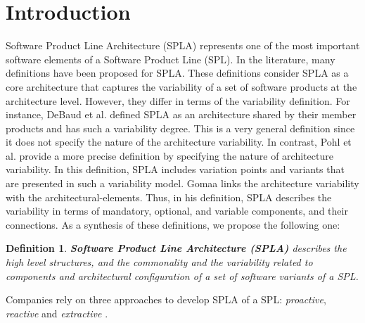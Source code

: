 \documentclass[graybox]{svmult}
\newtheorem{mydef}{Definition}
\begin{document}
\section{Introduction}
\label{sec:1:intro}
Software Product Line Architecture (SPLA) represents one of the most important software elements of a Software Product Line (SPL). In the literature, many definitions have been proposed for SPLA. These definitions consider SPLA as a core architecture that captures the variability of a set of software products at the architecture level. However, they differ in terms of the variability definition. For instance, DeBaud et al. \cite{debaud1998pulse} defined  SPLA as an architecture shared by their member products and has such a variability degree. This is a very general definition since it does not specify the nature of the architecture variability. In contrast, Pohl et al. \cite{3_pohl2005software} provide a more precise definition by specifying the nature of architecture variability. In this definition, SPLA includes variation points and variants that are presented in such a variability model. Gomaa \cite{Gomaa} links the architecture variability with the architectural-elements. Thus, in his definition, SPLA describes the variability in terms of mandatory, optional, and variable components, and their connections. As a synthesis of these definitions, we propose the following one:

\begin{mydef}
\textbf{Software Product Line Architecture (SPLA)} describes the high level structures, and the commonality and the variability related to components and architectural configuration of a set of software variants of a SPL. 
\end{mydef}

Companies rely on three approaches to develop SPLA of a SPL: \textit{proactive}, \textit{reactive} and \textit{extractive} \cite{gasparic2014analysis,shatnawi2017recovering}.
\end{document}

